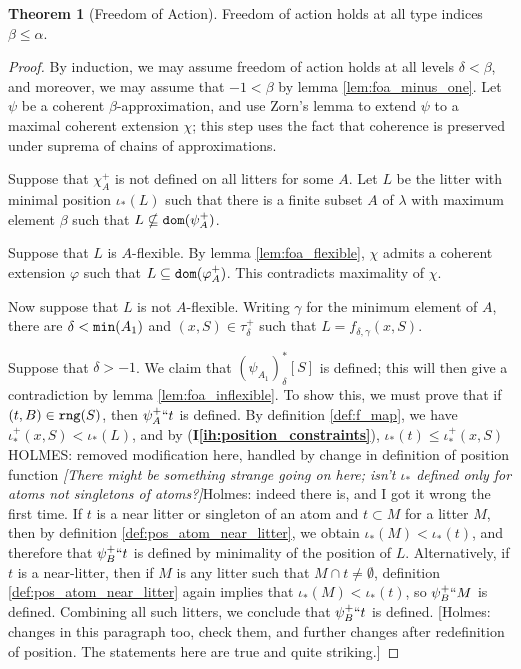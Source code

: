 \documentclass[112pt]{article}
\theoremstyle{definition}
\newtheorem{theorem}{Theorem}[section]
\theoremstyle{remark}
\newcommand{\ihref}[1]{(\textbf{I\ref{#1}})}
\newcommand{\rk}[1]{{\color{blue}\sl #1}}
\newcommand{\hsuggest}[1]{{\color{magenta}#1}}
\begin{document}
\begin{theorem}[Freedom of Action]\label{thm:foa}
  Freedom of action holds at all type indices $\beta \leq \alpha$.
\end{theorem}
\begin{proof}
  By induction, we may assume freedom of action holds at all levels $\delta < \beta$, and moreover, we may assume that $-1 < \beta$ by lemma \ref{lem:foa_minus_one}.
  Let $\psi$ be a coherent $\beta$-approximation, and use Zorn's lemma to extend $\psi$ to a maximal coherent extension $\chi$; this step uses the fact that coherence is preserved under suprema of chains of approximations.

  Suppose that $\chi_A^+$ is not defined on all litters for some $A$.
  Let $L$ be the litter with minimal position $\iota_*(L)$ such that there is a finite subset $A$ of $\lambda$ with maximum element $\beta$ such that $L \nsubseteq {\tt dom}(\psi_A^+)$.

  Suppose that $L$ is $A$-flexible.
  By lemma \ref{lem:foa_flexible}, $\chi$ admits a coherent extension $\varphi$ such that $L \subseteq {\tt dom}(\varphi_A^+)$.
  This contradicts maximality of $\chi$.

  Now suppose that $L$ is not $A$-flexible.
  Writing $\gamma$ for the minimum element of $A$, there are $\delta < {\tt min}(A_1)$ and $(x, S) \in \tau_\delta^+$ such that $L = f_{\delta,\gamma}(x, S)$.

  Suppose that $\delta > -1$.
  We claim that $(\psi_{A_1})_\delta^*[S]$ is defined; this will then give a contradiction by lemma \ref{lem:foa_inflexible}.
  To show this, we must prove that if $(t, B) \in {\tt rng}(S)$, then $\psi_A^+``t$ is defined.
  By definition \ref{def:f_map}, we have $\iota_*^+(x, S) < \iota_*(L)$, and by \ihref{ih:position_constraints}, $\iota_*(t) \leq \iota_*^+(x, S)$ %
\hsuggest{HOLMES: removed modification here, handled by change in definition of position function}
  \rk{[There might be something strange going on here; isn't $\iota_*$ defined only for atoms not singletons of atoms?]}\hsuggest{Holmes:  indeed there is, and I got it wrong the first time.}
  If $t$ is a near litter or singleton of an atom and $t \subset M$ for a litter $M$, then by definition \ref{def:pos_atom_near_litter}, we obtain $\iota_*(M) < \iota_*(t)$, and therefore that $\psi_B^+``t$ is defined by minimality of the position of $L$.
  Alternatively, if $t$ is a near-litter, then if $M$ is any litter such that $M \cap t \neq \emptyset$, definition \ref{def:pos_atom_near_litter} again implies that $\iota_*(M) < \iota_*(t)$, so $\psi_B^+``M$ is defined.
  Combining all such litters, we conclude that $\psi_B^+``t$ is defined.  \hsuggest{[Holmes:  changes in this paragraph too, check them, and further changes after redefinition of position.  The statements here are true and quite striking.]}


\end{proof}
\end{document}
